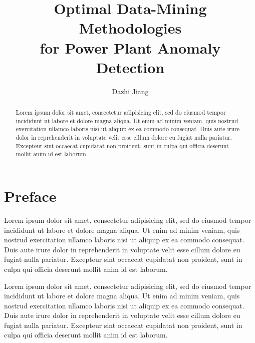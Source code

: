 \documentclass[10pt,a4paper,extrafontsizes,oldfontcommands,oneside]{memoir}
\author{Dazhi Jiang}
\title{Optimal Data-Mining Methodologies\\[10pt]
	for Power Plant Anomaly Detection}
\begin{document}

\frontmatter
\maketitle
{}
\maketitle
{}
\maketitle

\begin{abstract}
Lorem ipsum dolor sit amet, consectetur adipisicing elit, sed do eiusmod tempor incididunt ut labore et dolore magna aliqua. Ut enim ad minim veniam, quis nostrud exercitation ullamco laboris nisi ut aliquip ex ea commodo consequat. Duis aute irure dolor in reprehenderit in voluptate velit esse cillum dolore eu fugiat nulla pariatur. Excepteur sint occaecat cupidatat non proident, sunt in culpa qui officia deserunt mollit anim id est laborum.

\end{abstract}

\chapter*{Preface}
Lorem ipsum dolor sit amet, consectetur adipisicing elit, sed do eiusmod tempor incididunt ut labore et dolore magna aliqua. Ut enim ad minim veniam, quis nostrud exercitation ullamco laboris nisi ut aliquip ex ea commodo consequat. Duis aute irure dolor in reprehenderit in voluptate velit esse cillum dolore eu fugiat nulla pariatur. Excepteur sint occaecat cupidatat non proident, sunt in culpa qui officia deserunt mollit anim id est laborum.

Lorem ipsum dolor sit amet, consectetur adipisicing elit, sed do eiusmod tempor incididunt ut labore et dolore magna aliqua. Ut enim ad minim veniam, quis nostrud exercitation ullamco laboris nisi ut aliquip ex ea commodo consequat. Duis aute irure dolor in reprehenderit in voluptate velit esse cillum dolore eu fugiat nulla pariatur. Excepteur sint occaecat cupidatat non proident, sunt in culpa qui officia deserunt mollit anim id est laborum.
\end{document}
